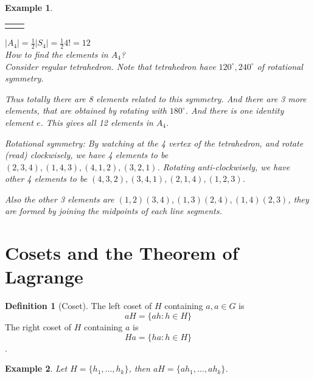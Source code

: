 \documentclass{article}
\theoremstyle{MyNonumberplain}
\theoremstyle{break}
\newcommand{\nline}{\begin{tabular}{ll}&\\\end{tabular}}
\theoremstyle{break}
\newtheorem{example}{Example}[section]
\theoremstyle{break}
\theoremstyle{definition}
\theoremstyle{break}
\newtheorem{definition}{Definition}[section]
\begin{document}
\begin{expbox}
    \begin{example}

        \nline

        $| A_4 | = \frac{1}{2} | S_4 | = \frac{1}{2} 4! = 12$\\

        How to find the elements in $A_4$?\\

        Consider regular tetrahedron. Note that tetrahedron have $120^{\circ}, 240^{\circ}$ of rotational symmetry.\bigskip

        Thus totally there are 8 elements related to this symmetry. And there are 3 more elements, that are obtained by rotating with $180^{\circ}$. And there is one identity element $e$. This gives all 12 elements in $A_4$.\bigskip
        
        Rotational symmetry: By watching at the 4 vertex of the tetrahedron, and
        rotate (read) clockwisely, we have 4 elements to be $(2, 3, 4), (1, 4, 3), (4,
        1, 2), (3, 2, 1)$. Rotating anti-clockwisely, we have other 4 elements to be
        $(4, 3, 2), (3, 4, 1), (2, 1, 4), (1, 2, 3)$.\bigskip

Also the other 3 elements are $(1, 2) (3, 4), (1, 3) (2, 4), (1, 4) (2, 3)$,
they are formed by joining the midpoints of each line segments. 

    \end{example}
\end{expbox}

\newpage

\section{Cosets and the Theorem of Lagrange}

\begin{defbox}
    \begin{definition}[Coset]
        The left coset of $H$ containing $a, a \in G$ is $$a H = \{ a h : h \in H \}$$
        The right coset of $H$ containing $a$ is $$H a = \{ h a : h \in H \}$$.
    \end{definition}
\end{defbox}

\begin{expbox}
    \begin{example}
        Let $H = \{ h_1, \ldots, h_k \}$, then $a H = \{ a h_1, \ldots, a h_k \}$. 
    \end{example}
\end{expbox}
\end{document}
